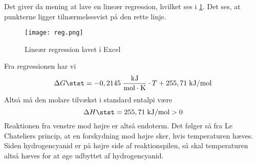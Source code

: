 \documentclass{report}
\begin{document}
Det giver da mening at lave en lineær regression, hvilket ses i \cref{fig:reg}.
Det ses, at punkterne ligger tilnærmelsesvist på den rette linje.
\begin{figure}[H]
\begin{center}
  \texttt{[image: reg.png]}
\end{center}
\caption{Lineær regression lavet i Excel}
\label{fig:reg}
\end{figure}
Fra regressionen har vi
\[
\Delta G \stst =-0,2145 \;\unit{\frac{kJ}{mol \cdot K}} \cdot T + 255,71 \;\unit{kJ/mol} 
\] 
Altså må den molare tilvækst i standard entalpi være 
\[
\Delta H \stst = 255,71 \;\unit{kJ/mol} >0
\] 
Reaktionen fra venstre mod højre er altså endoterm.
Det følger så fra Le Chateliers princip, at en forskydning mod højre sker, hvis temperaturen hæves.
Siden hydrogencyanid er på højre side af reaktionspilen, så skal temperaturen altså hæves for at øge udbyttet af hydrogencyanid.
\end{document}

